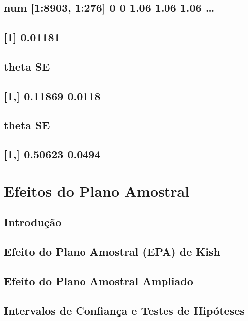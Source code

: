 \documentclass[]{book}
\theoremstyle{definition}
\theoremstyle{definition}
\theoremstyle{definition}
\theoremstyle{remark}
\begin{document}
\section{num {[}1:8903, 1:276{]} 0 0 1.06 1.06 1.06
\ldots{}}\label{num-18903-1276-0-0-1.06-1.06-1.06}

\section{{[}1{]} 0.01181}\label{section-16}

\section{theta SE}\label{theta-se}

\section{{[}1,{]} 0.11869 0.0118}\label{section-17}

\section{theta SE}\label{theta-se-1}

\section{{[}1,{]} 0.50623 0.0494}\label{section-18}

\chapter{Efeitos do Plano Amostral}\label{epa}

\section{Introdução}\label{introducao}

\section{Efeito do Plano Amostral (EPA) de
Kish}\label{efeito-do-plano-amostral-epa-de-kish}

\section{Efeito do Plano Amostral
Ampliado}\label{efeito-do-plano-amostral-ampliado}

\section{Intervalos de Confiança e Testes de
Hipóteses}\label{intervalos-de-confianca-e-testes-de-hipoteses}
\end{document}
